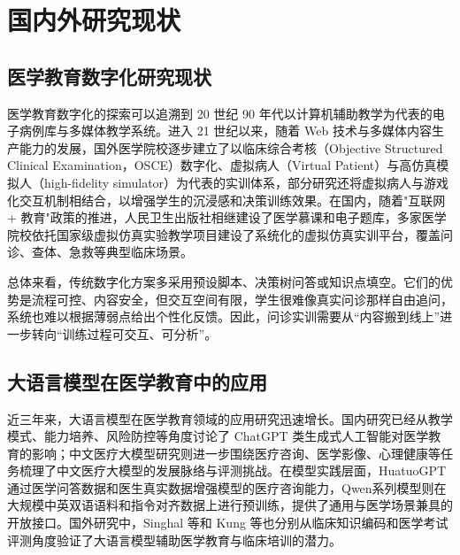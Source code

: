 \section{国内外研究现状}

\subsection{医学教育数字化研究现状}

医学教育数字化的探索可以追溯到 20 世纪 90 年代以计算机辅助教学为代表的电子病例库与多媒体教学系统。进入 21 世纪以来，随着 Web 技术与多媒体内容生产能力的发展，国外医学院校逐步建立了以临床综合考核（Objective Structured Clinical Examination，OSCE）数字化、虚拟病人（Virtual Patient）与高仿真模拟人（high-fidelity simulator）为代表的实训体系，部分研究还将虚拟病人与游戏化交互机制相结合，以增强学生的沉浸感和决策训练效果。在国内，随着"互联网 + 教育"政策的推进，人民卫生出版社相继建设了医学慕课和电子题库，多家医学院校依托国家级虚拟仿真实验教学项目建设了系统化的虚拟仿真实训平台，覆盖问诊、查体、急救等典型临床场景\cite{liu2021virtualsim}。

总体来看，传统数字化方案多采用预设脚本、决策树问答或知识点填空。它们的优势是流程可控、内容安全，但交互空间有限，学生很难像真实问诊那样自由追问，系统也难以根据薄弱点给出个性化反馈。因此，问诊实训需要从“内容搬到线上”进一步转向“训练过程可交互、可分析”。

\subsection{大语言模型在医学教育中的应用}

近三年来，大语言模型在医学教育领域的应用研究迅速增长。国内研究已经从教学模式、能力培养、风险防控等角度讨论了 ChatGPT 类生成式人工智能对医学教育的影响\cite{qu2023chatgpt}；中文医疗大模型研究则进一步围绕医疗咨询、医学影像、心理健康等任务梳理了中文医疗大模型的发展脉络与评测挑战\cite{ji2024chinesemedllm}。在模型实践层面，HuatuoGPT\cite{zhang2023huatuogpt}通过医学问答数据和医生真实数据增强模型的医疗咨询能力，Qwen\cite{bai2023qwen}系列模型则在大规模中英双语语料和指令对齐数据上进行预训练，提供了通用与医学场景兼具的开放接口。国外研究中，Singhal 等\cite{singhal2023clinicalknowledge}和 Kung 等\cite{kung2023chatgpt}也分别从临床知识编码和医学考试评测角度验证了大语言模型辅助医学教育与临床培训的潜力。

